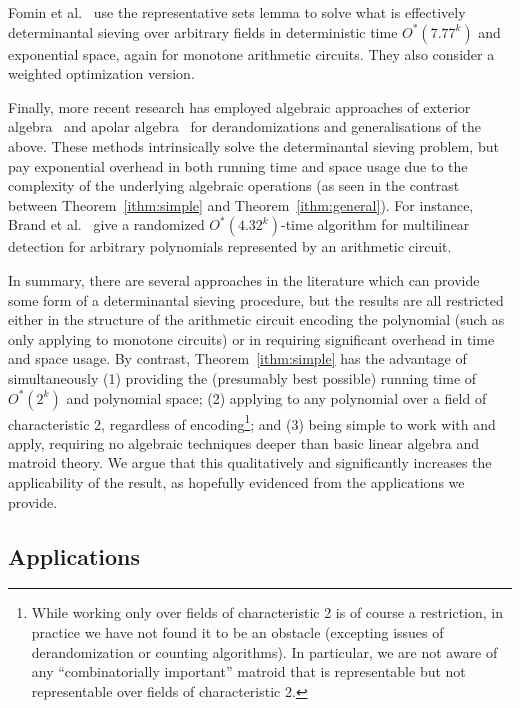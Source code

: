 \documentclass[10pt,a4paper]{article}
\begin{document}
Fomin et al.~\cite[Section~5.1]{FominLPS17} use the representative
sets lemma to solve what is effectively determinantal sieving over
arbitrary fields in deterministic time $O^*(7.77^k)$ and exponential
space, again for monotone arithmetic circuits.
They also consider a weighted optimization version.

Finally, more recent research has employed algebraic approaches of
exterior algebra~\cite{BrandDH18} and apolar algebra~\cite{BrandP21}
for derandomizations and generalisations of the above. 
These methods intrinsically solve the determinantal sieving problem,
but pay exponential overhead in both running time and space usage due
to the complexity of the underlying algebraic operations
(as seen in the contrast between Theorem~\ref{ithm:simple}
and Theorem~\ref{ithm:general}). 
For instance, Brand et al.~\cite{BrandDH18} give a randomized $O^*(4.32^k)$-time algorithm for multilinear 
detection for arbitrary polynomials represented by an arithmetic circuit.

In summary, there are several approaches in the literature which can 
provide some form of a determinantal sieving procedure, but
the results are all restricted either in the structure
of the arithmetic circuit encoding the polynomial (such as only
applying to monotone circuits) or in requiring significant 
overhead in time and space usage. By contrast, Theorem~\ref{ithm:simple}
has the advantage of simultaneously (1) providing the (presumably best
possible) running time of $O^*(2^k)$ and polynomial space;
(2) applying to any polynomial over a field of characteristic 2,
regardless of encoding\footnote{While working only over fields of
  characteristic 2 is of course a restriction, in practice we have not
  found it to be an obstacle (excepting issues of derandomization
  or counting algorithms). In particular, we are not
  aware of any ``combinatorially important'' matroid that is
  representable but not representable over fields of characteristic 2.
};
and (3) being simple to work with and apply,
requiring no algebraic techniques deeper than basic linear algebra and
matroid theory. We argue that this qualitatively and significantly
increases the applicability of the result, as hopefully evidenced from
the applications we provide.

\subsection{Applications}
\end{document}
